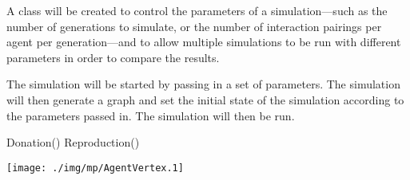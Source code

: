 A class will be created to control the parameters of a simulation---such
as the number of generations to simulate, or the number of interaction
pairings per agent per generation---and to allow multiple simulations to
be run with different parameters in order to compare the results.

The simulation will be started by passing in a set of parameters.
The simulation will then generate a graph and set the initial state of
the simulation according to the parameters passed in.
The simulation will then be run.

\begin{algorithmic}
    \State Donation()
    \State Reproduction()
\EndWhile
\end{algorithmic}

\texttt{[image: ./img/mp/AgentVertex.1]}
